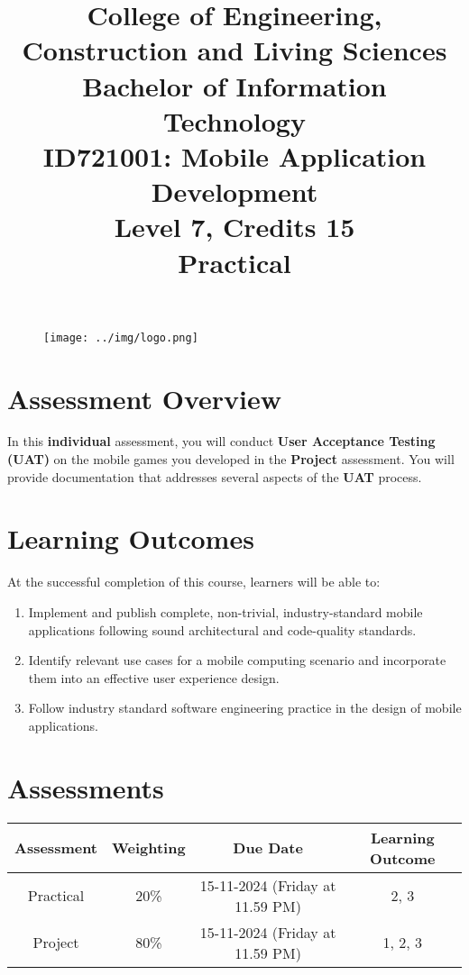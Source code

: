 \documentclass{article}
\author{}
\begin{document}
 

\begin{figure}
	\centering
	\texttt{[image: ../img/logo.png]}
\end{figure} 

\title{College of Engineering, Construction and Living Sciences\\Bachelor of Information Technology\\ID721001: Mobile Application Development\\Level 7, Credits 15\\\textbf{Practical}}
\date{}
\maketitle

\section*{Assessment Overview}
In this \textbf{individual} assessment, you will conduct \textbf{User Acceptance Testing (UAT)} on the mobile games you developed in the \textbf{Project} assessment. You will provide documentation that addresses several aspects of the \textbf{UAT} process. 

\section*{Learning Outcomes}
At the successful completion of this course, learners will be able to:
\begin{enumerate}
	\item Implement and publish complete, non-trivial, industry-standard mobile applications following sound architectural and code-quality standards.
	\item Identify relevant use cases for a mobile computing scenario and incorporate them into an effective user experience design.
	\item Follow industry standard software engineering practice in the design of mobile applications.
\end{enumerate}

\section*{Assessments}
\renewcommand{\arraystretch}{1.5}
\begin{tabular}{|c|c|c|c|}
	\hline
	\textbf{Assessment}                                 & \textbf{Weighting} & \textbf{Due Date}            & \textbf{Learning Outcome} \\ \hline
	\small Practical & \small 20\%        & \small 15-11-2024 (Friday at 11.59 PM)   & \small 2, 3                   \\ \hline
	\small Project                 & \small 80\%        & \small 15-11-2024 (Friday at 11.59 PM) \small  & \small 1, 2, 3                   \\ \hline
\end{tabular}
\end{document}

